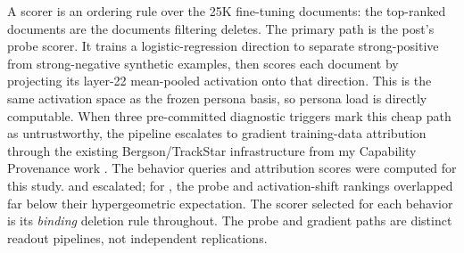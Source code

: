 A scorer is an ordering rule over the 25K fine-tuning documents: the
top-ranked documents are the documents filtering deletes. The primary path
is the post's probe scorer. It trains a logistic-regression direction to
separate strong-positive from strong-negative synthetic examples, then
scores each document by projecting its layer-22 mean-pooled activation onto
that direction. This is the same activation space as the frozen persona
basis, so persona load is directly computable. When three pre-committed
diagnostic triggers mark this cheap path as untrustworthy, the pipeline
escalates to gradient training-data attribution through the existing
Bergson/TrackStar infrastructure from my Capability Provenance work
\citep{matlin2026capability}. The behavior queries and attribution scores
were computed for this study.  and
 escalated; for , the
probe and activation-shift rankings overlapped far below their
hypergeometric expectation. The scorer selected for each behavior is its
\emph{binding} deletion rule throughout.
The probe and gradient paths are distinct readout pipelines, not independent
replications.
